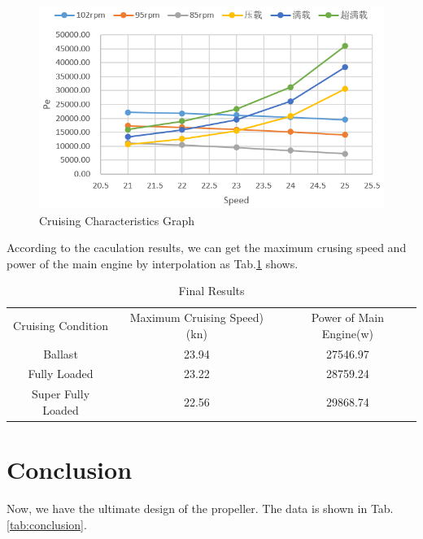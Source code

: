 \documentclass[a4paper,UTF8]{article}
\begin{document}
\begin{figure}[!htbp]
	\centering
	\includegraphics[width=5in]{figure/hangxingtexing.png}
	\caption{Cruising Characteristics Graph}
	\label{fig:hangxing}
\end{figure}
According to the caculation results, we can get the maximum crusing speed and power of the main engine by interpolation as Tab.\ref{tab:final} shows.
\begin{table}[!htbp]
	\centering
	\begin{tabular}{ccc}
		\hline
		Cruising Condition & Maximum Cruising Speed)(kn) & Power of Main Engine(w)\\
		Ballast&23.94&27546.97\\
		Fully Loaded&23.22&28759.24 \\
		Super Fully Loaded &22.56&	29868.74\\
		\hline
	\end{tabular}
\caption{Final Results}
\label{tab:final}
\end{table}

\section{Conclusion}
Now, we have the ultimate design of the propeller. The data is shown in Tab.\ref{tab:conclusion}.
\end{document}
